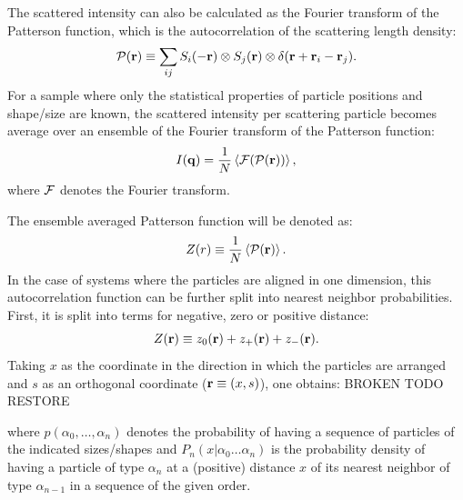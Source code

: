 The scattered intensity can also be calculated as the Fourier transform of the Patterson function, which is the autocorrelation of the scattering length density:
\begin{equation*}
  \mathcal{P} (\mathbf{r} ) \equiv \sum_{ij} S_i(-\mathbf{r} )\otimes S_j(\mathbf{r} )\otimes \delta (\mathbf{r} + \mathbf{r}_i - \mathbf{r}_j ).
\end{equation*}
For a sample where only the statistical properties of particle positions and shape/size are known, the scattered intensity per scattering particle becomes average over an ensemble of the Fourier transform of the Patterson function:
\begin{equation*}
  I(\mathbf{q} ) = \frac{1}{N}\left\langle\mathcal{F} (\mathcal{P} (\mathbf{r} ))\right\rangle,
\end{equation*}
where $\mathcal{F}$ denotes the Fourier transform.

The ensemble averaged Patterson function will be denoted as:
\begin{equation*}
  Z(r) \equiv \frac{1}{N}\left\langle\mathcal{P} (\mathbf{r} )\right\rangle.
\end{equation*}
In the case of systems where the particles are aligned in one dimension, this autocorrelation function can be further split into nearest neighbor probabilities. First, it is split into terms for negative, zero or positive distance:
\begin{equation*}
  Z(\mathbf{r} ) \equiv z_0(\mathbf{r} ) + z_+(\mathbf{r} ) + z_-(\mathbf{r} ).
\end{equation*}
Taking $x$ as the coordinate in the direction in which the particles are arranged and $s$ as an orthogonal coordinate ($\mathbf{r} \equiv (x,s)$), one obtains:
BROKEN TODO RESTORE

where $p(\alpha_0,\dotsc ,\alpha_n)$ denotes the probability of having a sequence of particles of the indicated sizes/shapes and $P_n(x|\alpha_0\dotsc\alpha_n)$ is the probability density of having a particle of type $\alpha_n$ at a (positive) distance $x$ of its nearest neighbor of type $\alpha_{n-1}$ in a sequence of the given order.

